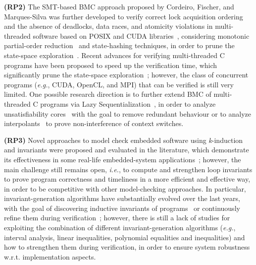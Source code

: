 \documentclass{acm_sen_article}
\begin{document}
\textbf{(RP2)} The SMT-based BMC approach proposed by Cordeiro, Fischer, and Marques-Silva was further developed to verify correct lock acquisition ordering and the absence of deadlocks, data races, and atomicity violations in multi-threaded software based on POSIX and CUDA libraries~\cite{CordeiroF11,Pereira15}, considering monotonic partial-order reduction~\cite{KahlonWG09} and state-hashing techniques, in order to prune the state-space exploration~\cite{morse15}. Recent advances for verifying multi-threaded C programs have been proposed to speed up the verification time, which significantly prune the state-space exploration~\cite{Inverso14,civl15}; however, the class of concurrent programs ({\it e.g.}, CUDA, OpenCL, and MPI) that can be verified is still very limited. One possible research direction is to further extend BMC of multi-threaded C programs via Lazy Sequentialization~\cite{Inverso14}, in order to analyze unsatisfiability cores~\cite{Grumberg05} with the goal to remove redundant behaviour or to analyze interpolants~\cite{McMillan11} to prove non-interference of context switches.

\textbf{(RP3)} Novel approaches to model check embedded software using \textit{k}-induction and invariants were proposed and evaluated in the literature, which demonstrate its effectiveness in some real-life embedded-system applications~\cite{Gadelha15,Brain15,Rocha15,Donaldson10,Rocha17}; however, the main challenge still remains open, {\it i.e.}, to compute and strengthen loop invariants to prove program correctness and timeliness in a more efficient and effective way, in order to be competitive with other model-checking approaches. In particular, invariant-generation algorithms have substantially evolved over the last years, with the goal of discovering inductive invariants of programs~\cite{pips:2013,Henry:2012} or continuously refine them during verification~\cite{Beyer15}; however, there is still a lack of studies for exploiting the combination of different invariant-generation algorithms ({\it e.g.}, interval analysis, linear inequalities, polynomial equalities and inequalities) and how to strengthen them during verification, in order to ensure system robustness w.r.t. implementation aspects.
\end{document}
